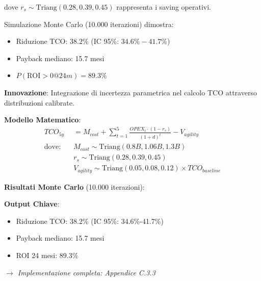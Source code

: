 dove $r_s \sim \text{Triang}(0.28, 0.39, 0.45)$ rappresenta i saving operativi.

\begin{tcolorbox}[colback=yellow!10!white,colframe=orange!75!black,title=Risultato Chiave]
Simulazione Monte Carlo (10.000 iterazioni) dimostra:
\begin{itemize}
\item Riduzione TCO: $38.2\%$ (IC 95\%: $34.6\%-41.7\%$)
\item Payback mediano: 15.7 mesi
\item $P(\text{ROI}>0 @ 24m) = 89.3\%$
\end{itemize}
\end{tcolorbox}
\begin{tcolorbox}[
    colback=orange!5!white,
    colframe=orange!65!black,
    title={\textbf{Innovation Box 3.1:} Modello TCO Stocastico per Cloud Migration},
    fonttitle=\bfseries,
    boxrule=1.5pt,
    arc=2mm,
    breakable
]
\textbf{Innovazione}: Integrazione di incertezza parametrica nel calcolo TCO attraverso distribuzioni calibrate.

\vspace{0.3cm}
\textbf{Modello Matematico}:
\begin{align*}
TCO_{5y} &= M_{cost} + \sum_{t=1}^{5} \frac{OPEX_t \cdot (1-r_s)}{(1+d)^t} - V_{agility} \\
\text{dove:} \quad & M_{cost} \sim \text{Triang}(0.8B, 1.06B, 1.3B) \\
& r_s \sim \text{Triang}(0.28, 0.39, 0.45) \\
& V_{agility} \sim \text{Triang}(0.05, 0.08, 0.12) \times TCO_{baseline}
\end{align*}

\vspace{0.3cm}
\textbf{Risultati Monte Carlo} (10.000 iterazioni):
\begin{center}
\end{center}

\textbf{Output Chiave}:
\begin{itemize}%
    \item Riduzione TCO: 38.2\% (IC 95\%: 34.6\%-41.7\%)
    \item Payback mediano: 15.7 mesi
    \item ROI 24 mesi: 89.3\%
\end{itemize}

\textit{$\rightarrow$ Implementazione completa: Appendice C.3.3}
\end{tcolorbox}


